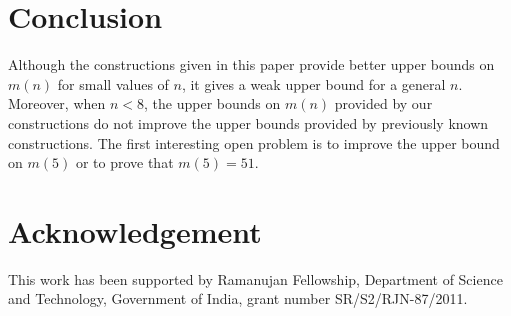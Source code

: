 \documentclass[11pt]{article}
\begin{document}
\section{Conclusion}

Although the constructions given in this paper provide better upper bounds on $m(n)$ for small values of $n$, it gives a weak upper bound for a general $n$. Moreover, when $n<8$, the upper bounds on $m(n)$ provided by our constructions do not improve the upper bounds provided by  previously known constructions. The first interesting open problem is to improve the upper bound on $m(5)$ or to prove that $m(5)=51$.

\section*{Acknowledgement}

This work has been supported by Ramanujan Fellowship, Department of Science and Technology, Government of India, grant number SR/S2/RJN-87/2011.
\end{document}
